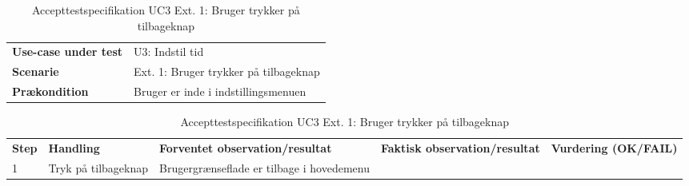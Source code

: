 \begin{table}[H]
	\centering
	\caption{Accepttestspecifikation UC3 Ext. 1: Bruger trykker på tilbageknap}
	\label{ATUC1:Ext1}
	\begin{tabular}{ p{80pt}  p{320pt} }\hline
		\rowcolor{lightgray}	
		\textbf{Use-case under test} & U3: Indstil tid \\
		\rowcolor{white}
		\textbf{Scenarie} & Ext. 1: Bruger trykker på tilbageknap \\\rowcolor{lightgray}	
		\textbf{Prækondition} &
		Bruger er inde i indstillingsmenuen \\
		\hline
	\end{tabular}
	\begin{tabular}{  p{26pt} p{100pt}  p{101pt} | p{67pt} | p{68pt}}
		\textbf{Step} & \textbf{Handling} & \textbf{Forventet observation/resultat} & \textbf{Faktisk observation/resultat} & \textbf{Vurdering (OK/FAIL)}\\
		1 & Tryk på tilbageknap & Brugergrænseflade er tilbage i hovedemenu
 &  &  \\
		\hline
	\end{tabular}
\end{table}

